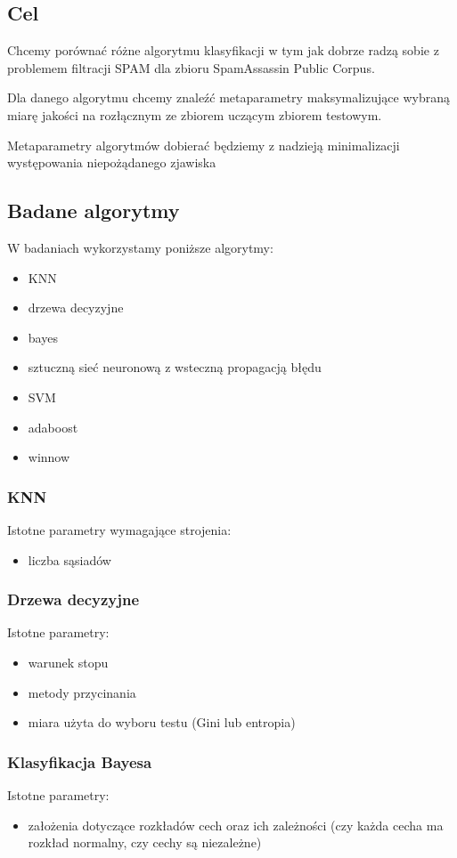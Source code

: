 \documentclass[fleqn]{article}
\begin{document}
\subsection{Cel}
Chcemy porównać różne algorytmu klasyfikacji w tym jak dobrze radzą sobie z problemem filtracji SPAM dla zbioru SpamAssassin Public Corpus.

Dla danego algorytmu chcemy znaleźć metaparametry maksymalizujące wybraną miarę jakości na rozłącznym ze zbiorem uczącym zbiorem testowym.

Metaparametry algorytmów dobierać będziemy z nadzieją minimalizacji występowania niepożądanego zjawiska 


\subsection{Badane algorytmy}
W badaniach wykorzystamy poniższe algorytmy:
\begin{itemize}
    \item KNN
    \item drzewa decyzyjne
    \item bayes
    \item sztuczną sieć neuronową z wsteczną propagacją błędu
    \item SVM
    \item adaboost
    \item winnow 
\end{itemize}

\subsubsection{KNN}
Istotne parametry wymagające strojenia: 
\begin{itemize}
    \item liczba sąsiadów
\end{itemize}

\subsubsection{Drzewa decyzyjne}
Istotne parametry: 
\begin{itemize}
    \item warunek stopu
    \item metody przycinania
    \item miara użyta do wyboru testu (Gini lub entropia)
\end{itemize}

\subsubsection{Klasyfikacja Bayesa}
Istotne parametry: 
\begin{itemize}
    \item założenia dotyczące rozkładów cech oraz ich zależności (czy każda cecha ma rozkład normalny, czy cechy są niezależne)
\end{itemize}
\end{document}
